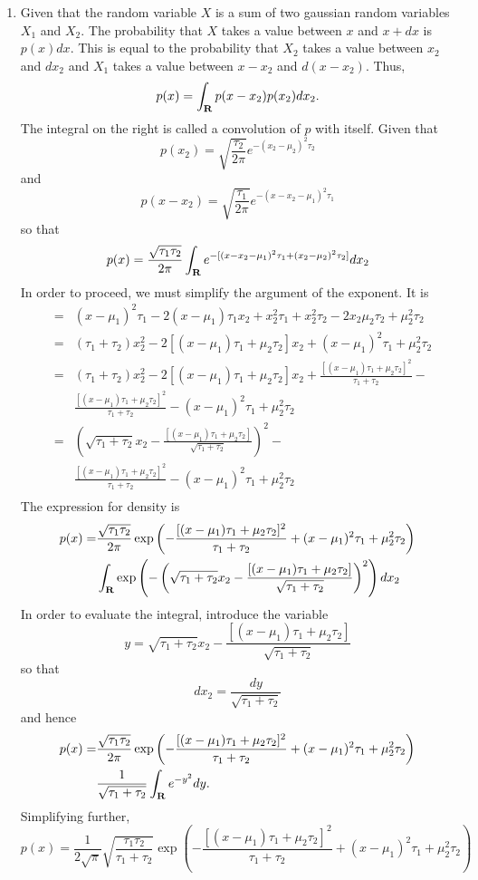 \begin{enumerate}
\item Given that the random variable $X$ is a sum of two gaussian random variables $X_1$ and $X_2$.
The probability that $X$ takes a value between $x$ and $x + dx$ is $p(x)dx$. This is equal to the
probability that $X_2$ takes a value between $x_2$ and $dx_2$ and $X_1$ takes a value between $x - x_2$
and $d(x - x_2)$. Thus,
\[
p(x) = \int_{\mathbf{R}} p(x - x_2)p(x_2)dx_2.
\]
The integral on the right is called a convolution of $p$ with itself. Given that
\[
p(x_2) = \sqrt{\frac{\tau_2}{2\pi}}e^{-(x_2 - \mu_2)^2\tau_2}
\]
and
\[
p(x - x_2) = \sqrt{\frac{\tau_1}{2\pi}}e^{-(x - x_2 - \mu_1)^2\tau_1}
\]
so that
\[
p(x) = \frac{\sqrt{\tau_1\tau_2}}{2\pi}\int_{\mathbf{R}} e^{-[(x - x_2 - \mu_1)^2\tau_1 + (x_2 - \mu_2)^2\tau_2]}dx_2
\]
In order to proceed, we must simplify the argument of the exponent. It is
\begin{eqnarray*}
&=& (x - \mu_1)^2\tau_1 - 2(x - \mu_1)\tau_1x_2 + x_2^2\tau_1 + x_2^2\tau_2 - 2x_2\mu_2\tau_2 + \mu_2^2\tau_2 \\
&=& (\tau_1 + \tau_2)x_2^2 -2[(x - \mu_1)\tau_1 + \mu_2\tau_2]x_2 + (x - \mu_1)^2\tau_1 + \mu_2^2\tau_2 \\
&=& (\tau_1 + \tau_2)x_2^2 -2[(x - \mu_1)\tau_1 + \mu_2\tau_2]x_2 + \frac{[(x - \mu_1)\tau_1 + \mu_2\tau_2]^2}{\tau_1 + \tau_2} - \\
& & \frac{[(x - \mu_1)\tau_1 + \mu_2\tau_2]^2}{\tau_1 + \tau_2} - (x - \mu_1)^2\tau_1 + \mu_2^2\tau_2 \\
&=& \left(\sqrt{\tau_1 + \tau_2}x_2 - \frac{[(x - \mu_1)\tau_1 + \mu_2\tau_2]}{\sqrt{\tau_1 + \tau_2}}\right)^2 - \\
& & \frac{[(x - \mu_1)\tau_1 + \mu_2\tau_2]^2}{\tau_1 + \tau_2} - (x - \mu_1)^2\tau_1 + \mu_2^2\tau_2 \\
\end{eqnarray*}
The expression for density is
\[
\begin{split}
p(x) = & \frac{\sqrt{\tau_1\tau_2}}{2\pi}\exp\left(-\frac{[(x - \mu_1)\tau_1 + \mu_2\tau_2]^2}{\tau_1 + \tau_2} + (x - \mu_1)^2\tau_1 + \mu_2^2\tau_2\right) \\
 & \int_{\mathbf{R}}\exp\left(-\left(\sqrt{\tau_1 + \tau_2}x_2 - \frac{[(x - \mu_1)\tau_1 + \mu_2\tau_2]}{\sqrt{\tau_1 + \tau_2}}\right)^2\right)dx_2
\end{split}
\]
In order to evaluate the integral, introduce the variable
\[
y = \sqrt{\tau_1 + \tau_2}x_2 - \frac{[(x - \mu_1)\tau_1 + \mu_2\tau_2]}{\sqrt{\tau_1 + \tau_2}}
\]
so that
\[
dx_2 = \frac{dy}{\sqrt{\tau_1 + \tau_2}}
\]
and hence
\[
\begin{split}
p(x) = & \frac{\sqrt{\tau_1\tau_2}}{2\pi}\exp\left(-\frac{[(x - \mu_1)\tau_1 + \mu_2\tau_2]^2}{\tau_1 + \tau_2} + (x - \mu_1)^2\tau_1 + \mu_2^2\tau_2\right) \\
 & \frac{1}{\sqrt{\tau_1+\tau_2}}\int_{\mathbf{R}} e^{-y^2}dy.
\end{split}
\]
Simplifying further,
\[
p(x) = \frac{1}{2\sqrt{\pi}}\sqrt{\frac{\tau_1\tau_2}{\tau_1 + \tau_2}}\exp\left(-\frac{[(x - \mu_1)\tau_1 + \mu_2\tau_2]^2}{\tau_1 + \tau_2} + (x - \mu_1)^2\tau_1 + \mu_2^2\tau_2\right) 
\]
\end{enumerate}

